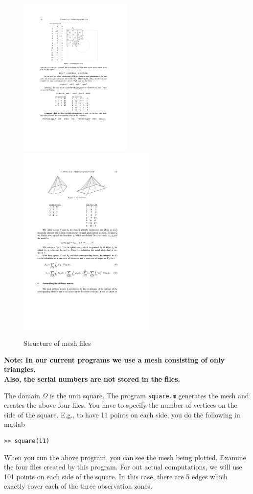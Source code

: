 \documentclass[12pt]{article}
\begin{document}
\begin{figure}
\begin{center}
\includegraphics[width=0.5\textwidth]{fem50_2}
\includegraphics[width=0.6\textwidth]{fem50_4}
\caption{Structure of mesh files}
\label{fig:fem502}
\end{center}
\end{figure}

\begin{center}
{\bf Note: In our current programs we use a mesh consisting of only triangles. \\
Also, the serial numbers are not stored in the files. }
\end{center}

The domain $\Omega$ is the unit square. The program {\tt square.m} generates the mesh and creates the above four files. You have to specify the number of vertices on the side of the square. E.g., to have 11 points on each side, you do the following in matlab
\begin{lstlisting}
>> square(11)
\end{lstlisting}
When you run the above program, you can see the mesh being plotted. Examine the four files created by this program. For out actual computations, we will use 101 points on each side of the square. In this case, there are 5 edges which exactly cover each of the three observation zones.
\end{document}
